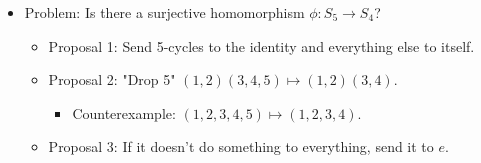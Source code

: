 \documentclass[../notes.tex]{subfiles}
\begin{document}
\begin{itemize}
\begin{proof}

        Suppose $\phi$ is injective. We know that $\phi(e_H)=e_G$ from a previous lemma; this implies that $e_H\in\ker\phi$. Now let $x\in\ker\phi$ be arbitrary. Then $\phi(x)=e_G=\phi(e_H)$. But since $\phi$ is injective, we have that $x=e_H$. Thus, we have proven that $e_H\in\ker\phi$, and any $x\in\ker\phi$ is equal to $e_H$; hence, we know that $\ker\phi=\{e_H\}$, as desired.\par
        Now suppose that $\ker\phi=\{e_H\}$. Let $\phi(x)=\phi(y)$. It follows that
        \begin{equation*}
            \phi(xy^{-1}) = \phi(x)\phi(y^{-1})
            = \phi(x)\phi(y)^{-1}
            = \phi(x)\phi(x)^{-1}
            = e_G
        \end{equation*}
        But this implies that
        \begin{align*}
            xy^{-1} &= e_H\\
            x &= y
        \end{align*}
        as desired.
    \end{proof}
    \item Problem: Is there a surjective homomorphism $\phi:S_5\to S_4$?
    \begin{itemize}
        \item Proposal 1: Send 5-cycles to the identity and everything else to itself.
        \item Proposal 2: "Drop 5" $(1,2)(3,4,5)\mapsto(1,2)(3,4)$.
        \begin{itemize}
            \item Counterexample: $(1,2,3,4,5)\mapsto(1,2,3,4)$.
        \end{itemize}
        \item Proposal 3: If it doesn't do something to everything, send it to $e$.

\end{itemize}
\end{itemize}
\end{document}
